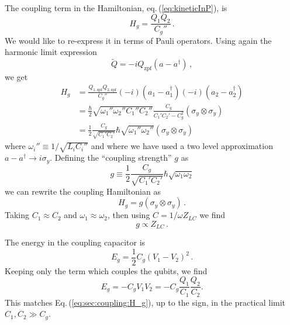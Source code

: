 The coupling term in the Hamiltonian, eq.\,(\ref{eq:kineticInP}), is
\begin{equation}
  H_g = \frac{ Q_1 Q_2} {C_g''} \, . \label{eq:sec:coupling:H_g}
\end{equation}
We would like to re-express it in terms of Pauli operators.
Using again the harmonic limit expression
\begin{equation}
  \tilde{Q} = -i Q_{\textrm{zpf}} (a - a^{\dagger}) \, ,
\end{equation}
we get
\begin{align*}
  H_g
  &= \frac{Q_{1,\textrm{zpf}}Q_{2,\textrm{zpf}}}{C_g''}
    (-i)(a_1 - a_1^{\dagger}) (-i)(a_2 - a_2^{\dagger}) \\
  &= \frac{\hbar}{2} \sqrt{\omega_1'' \omega_2'' C_1'' C_2''}
    \frac{C_g}{C_1' C_2' - C_g^2} (\sigma_y \otimes \sigma_y) \\
  &= \frac{1}{2}\frac{C_g}{\sqrt{C_1' C_2'}} \hbar
    \sqrt{\omega_1'' \omega_2''} (\sigma_y \otimes \sigma_y)
\end{align*}
where $\omega_i'' \equiv 1 / \sqrt{L_i C_i''}$ and where we have used a two level approximation \mbox{$a - a^\dagger \rightarrow i \sigma_y$}.
Defining the ``coupling strength'' $g$ as
\begin{equation}
  g \equiv \frac{1}{2} \frac{C_g}{\sqrt{C_1' C_2'}} \hbar\sqrt{\omega_1\omega_2}
\end{equation}
we can rewrite the coupling Hamiltonian as
\begin{equation}
  H_g = g \left( \sigma_y \otimes \sigma_y \right) \, .
\end{equation}
Taking $C_1 \approx C_2$ and $\omega_1 \approx \omega_2$, then using $C = 1 / \omega Z_{LC}$ we find
\begin{equation}
  g \propto Z_{LC} \, .
\end{equation}


The energy in the coupling capacitor is
\begin{equation}
E_g = \frac{1}{2} C_g \left( V_1 - V_2 \right)^2 \, . \nonumber
\end{equation}
Keeping only the term which couples the qubits, we find \begin{equation}
E_g = -C_g V_1 V_2 = -C_g \frac{Q_1}{C_1} \frac{Q_2}{C_2} . \end{equation}
This matches Eq.\,(\ref{eq:sec:coupling:H_g}), up to the sign, in the practical limit $C_1,C_2 \gg C_g$.

